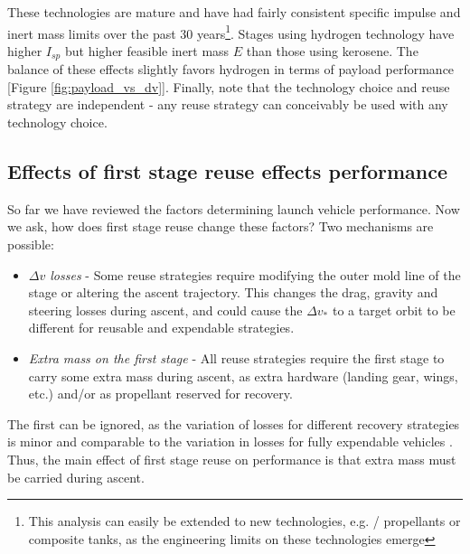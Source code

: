 \documentclass[conf]{new-aiaa}
\begin{document}
\begin{multicols}{2}
These technologies are mature and have had fairly consistent specific impulse and inert mass limits over the past 30 years\footnote{This analysis can easily be extended to new technologies, e.g.  /  propellants or composite tanks, as the engineering limits on these technologies emerge}. Stages using hydrogen technology have higher $I_{sp}$ but higher feasible inert mass $E$ than those using kerosene. The balance of these effects slightly favors hydrogen in terms of payload performance [Figure \ref{fig:payload_vs_dv}]. Finally, note that the technology choice and reuse strategy are independent - any reuse strategy can conceivably be used with any technology choice.

\subsection{Effects of first stage reuse effects performance}
So far we have reviewed the factors determining launch vehicle performance. Now we ask, how does first stage reuse change these factors? Two mechanisms are possible:

\begin{itemize}
    \item \emph{$\Delta v$ losses} - Some reuse strategies require modifying the outer mold line of the stage or altering the ascent trajectory. This changes the drag, gravity and steering losses during ascent, and could cause the $\Delta v_*$ to a target orbit to be different for reusable and expendable strategies.
    \item \emph{Extra mass on the first stage} - All reuse strategies require the first stage to carry some extra mass during ascent, as extra hardware (landing gear, wings, etc.) and/or as propellant reserved for recovery.
\end{itemize}

The first can be ignored, as the variation of losses for different recovery strategies is minor and comparable to the variation in losses for fully expendable vehicles \cite{Stappert2017}. Thus, the main effect of first stage reuse on performance is that extra mass must be carried during ascent.


\end{multicols}
\end{document}
